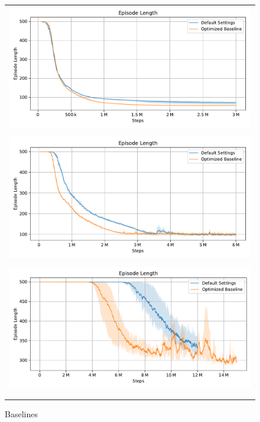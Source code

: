 \begin{figure}[htp]
    \begin{center}
        \begin{tabular}{c}
            \includegraphics[clip, width=0.8\columnwidth]{figures/evaluation/baseline/maze0318_ep_len.pdf} \\
            \addlinespace[0.15cm]
            {\small (a) Maze0318} \\
            \addlinespace[0.5cm]
            \includegraphics[clip, width=0.8\columnwidth]{figures/evaluation/baseline/vessel_ep_len.pdf} \\
            \addlinespace[0.15cm]
            {\small (b) Vessel} \\
            \addlinespace[0.5cm]
            \includegraphics[clip, width=0.8\columnwidth]{figures/evaluation/baseline/maze0122_ep_len.pdf} \\
            \addlinespace[0.15cm]
            {\small (c) Maze0122} \\
            \addlinespace[0.5cm]
        \end{tabular}

    \end{center}
    \caption{Baselines} \label{fig:Eval/Baselines}
\end{figure}


